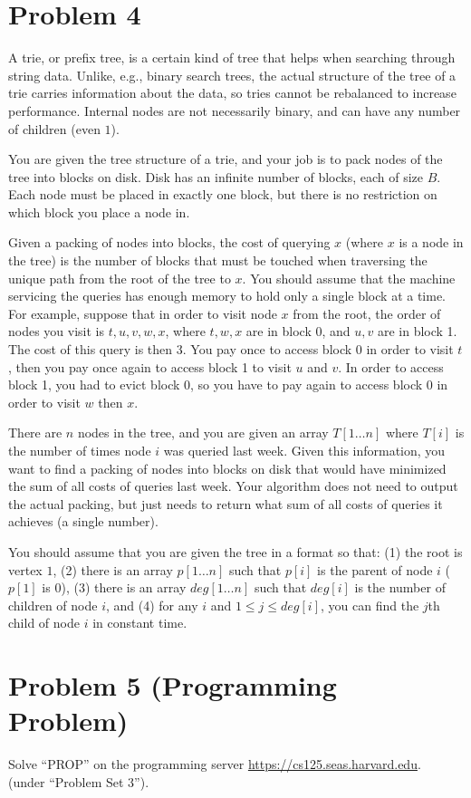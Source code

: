 \documentclass[12pt]{article}
\begin{document}
\section*{Problem 4}

A trie, or prefix tree, is a certain kind of tree that helps when
searching
through string data.  Unlike, e.g., binary search trees, the actual 
structure of the tree of a trie carries information about the data,
so tries cannot be rebalanced to increase performance. Internal nodes are not necessarily binary, and can have any number of children (even $1$).

You are given the tree structure of a trie, and your job is to
pack nodes of the tree into blocks on disk.  Disk has an infinite
number of blocks, each of size $B$.
Each node must be placed in exactly one block, but there is no
restriction on which block you place a node in.

Given a packing of nodes into blocks, the cost of querying $x$ (where
$x$ is a node in the tree) is the number of blocks that must be
touched when traversing the unique path from the root of the tree to $x$.
You should assume that the machine servicing the queries has enough
memory to
hold only a single block at a time.  For example, suppose that in order to
visit node $x$ from the root, the order of nodes you visit is $t, u,
v, w, x$, where $t,w,x$ are in block 0, and $u,v$ are in block 1.  The
cost of this query is then 3.  You pay once to access block 0 in order
to visit $t$, then you pay once again to access block 1 to visit $u$ and $v$.
In order to access block 1, you had to evict block 0, so you have to
pay again to access block 0 in order to visit $w$ then $x$.

There are $n$ nodes in the tree, and you are given an array $T[1\ldots n]$ where
$T[i]$ is the number of times node $i$ was queried last week.
Given this information, you want to find a packing of nodes into
blocks on disk that would have minimized the sum of all costs of queries last week.
Your algorithm does not need to output the actual packing, but just needs to return what 
sum of all costs of queries it achieves (a single number).

You should assume that you are given the tree in a format so that: (1) the root is vertex $1$,
(2) there is an array $p[1\ldots n]$ such that $p[i]$ is the parent of node $i$ ($p[1]$ is $0$),
(3) there is an array $deg[1\ldots n]$ such that $deg[i]$ is the number of children of node $i$,
and (4) for any $i$ and $1\le j\le deg[i]$, you can find the $j$th child of node $i$ in constant time.


\section*{Problem 5 (Programming Problem)}
Solve ``PROP'' on the programming server \url{https://cs125.seas.harvard.edu}.\\
(under ``Problem Set 3'').
\end{document}
